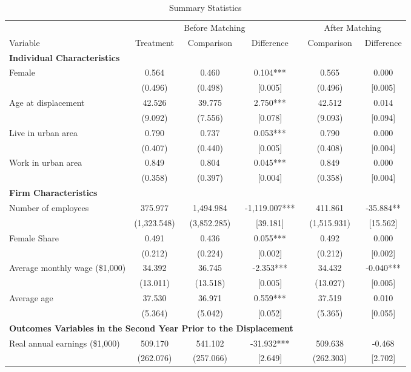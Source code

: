 \documentclass[12pt]{article}
\renewcommand{\arraystretch}{1.0} %
\begin{document}
\begin{table}[htbp]
\renewcommand{\arraystretch}{0.85}
\setlength{\tabcolsep}{0.1mm}{}
  \centering
  \caption{Summary Statistics}
{\small
    \begin{tabular}{lccccc}
\toprule
          & \multicolumn{3}{c}{Before Matching} & \multicolumn{2}{c}{After Matching} \\
          \cmidrule(r){2-4} \cmidrule(l){5-6}
    Variable & Treatment & ~Comparison~ & Difference & ~Comparison~ & Difference \\
          \midrule \midrule
    \textbf{Individual Characteristics} &       &       &       &       &  \\
    Female & 0.564 & 0.460 & 0.104*** & 0.565 & 0.000 \\
          & (0.496) & (0.498) & [0.005] & (0.496) & [0.005] \\
    Age at displacement   & 42.526 & 39.775 & 2.750*** & 42.512 & 0.014 \\
          & (9.092) & (7.556) & [0.078] & (9.093) & [0.094] \\
    Live in urban area & 0.790 & 0.737 & 0.053*** & 0.790 & 0.000 \\
          & (0.407) & (0.440) & [0.005] & (0.408) & [0.004] \\
    Work in urban area & 0.849 & 0.804 & 0.045*** & 0.849 & 0.000 \\
          & (0.358) & (0.397) & [0.004] & (0.358) & [0.004] \\
          \midrule
    \textbf{Firm Characteristics} &       &       &       &       &  \\
    Number of employees & 375.977 & 1,494.984 & -1,119.007*** & 411.861 & -35.884** \\
          & (1,323.548) & (3,852.285) & [39.181] & (1,515.931) & [15.562] \\
    Female Share & 0.491 & 0.436 & 0.055*** & 0.492 & 0.000 \\
          & (0.212) & (0.224) & [0.002] & (0.212) & [0.002] \\
    Average monthly wage (\$1,000) & 34.392 & 36.745 & -2.353*** & 34.432 & -0.040*** \\
          & (13.011) & (13.518) & [0.005] & (13.027) & [0.005] \\
    Average age & 37.530 & 36.971 & 0.559*** & 37.519 & 0.010 \\
          & (5.364) & (5.042) & [0.052] & (5.365) & [0.055] \\
          \midrule
    \multicolumn{5}{l}{\textbf{Outcomes Variables in the Second Year Prior to the Displacement}}  \\
    Real annual earnings (\$1,000) & 509.170 & 541.102 & -31.932*** & 509.638 & -0.468 \\
          & (262.076) & (257.066) & [2.649] & (262.303) & [2.702] \\


\end{tabular}}
\end{table}
\end{document}
